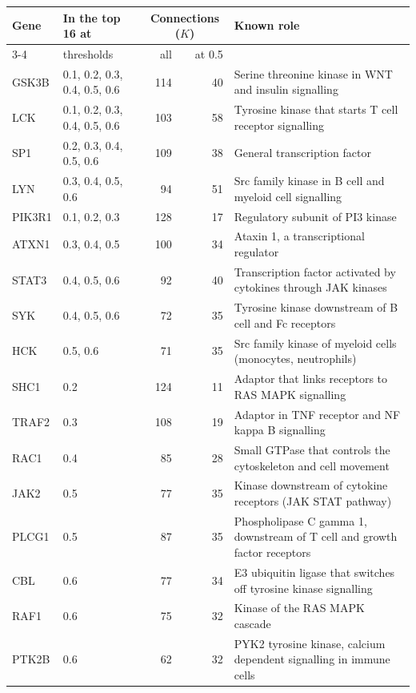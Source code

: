 \begin{tabular}{llrrp{7.4cm}}
\toprule
Gene & In the top 16 at & \multicolumn{2}{c}{Connections ($K$)} & Known role \\
\cmidrule(lr){3-4}
 & thresholds & all & at 0.5 & \\
\midrule
GSK3B & 0.1, 0.2, 0.3, 0.4, 0.5, 0.6 & 114 & 40 & Serine threonine kinase in WNT and insulin signalling \\
LCK & 0.1, 0.2, 0.3, 0.4, 0.5, 0.6 & 103 & 58 & Tyrosine kinase that starts T cell receptor signalling \\
SP1 & 0.2, 0.3, 0.4, 0.5, 0.6 & 109 & 38 & General transcription factor \\
LYN & 0.3, 0.4, 0.5, 0.6 & 94 & 51 & Src family kinase in B cell and myeloid cell signalling \\
PIK3R1 & 0.1, 0.2, 0.3 & 128 & 17 & Regulatory subunit of PI3 kinase \\
ATXN1 & 0.3, 0.4, 0.5 & 100 & 34 & Ataxin 1, a transcriptional regulator \\
STAT3 & 0.4, 0.5, 0.6 & 92 & 40 & Transcription factor activated by cytokines through JAK kinases \\
SYK & 0.4, 0.5, 0.6 & 72 & 35 & Tyrosine kinase downstream of B cell and Fc receptors \\
HCK & 0.5, 0.6 & 71 & 35 & Src family kinase of myeloid cells (monocytes, neutrophils) \\
SHC1 & 0.2 & 124 & 11 & Adaptor that links receptors to RAS MAPK signalling \\
TRAF2 & 0.3 & 108 & 19 & Adaptor in TNF receptor and NF kappa B signalling \\
RAC1 & 0.4 & 85 & 28 & Small GTPase that controls the cytoskeleton and cell movement \\
JAK2 & 0.5 & 77 & 35 & Kinase downstream of cytokine receptors (JAK STAT pathway) \\
PLCG1 & 0.5 & 87 & 35 & Phospholipase C gamma 1, downstream of T cell and growth factor receptors \\
CBL & 0.6 & 77 & 34 & E3 ubiquitin ligase that switches off tyrosine kinase signalling \\
RAF1 & 0.6 & 75 & 32 & Kinase of the RAS MAPK cascade \\
PTK2B & 0.6 & 62 & 32 & PYK2 tyrosine kinase, calcium dependent signalling in immune cells \\
\bottomrule
\end{tabular}
